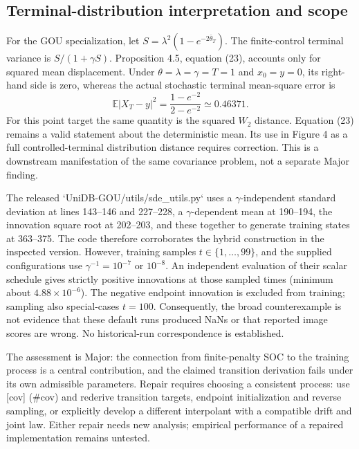 \documentclass[10pt]{article}
\begin{document}
\subsection*{Terminal-distribution interpretation and scope}
For the GOU specialization, let \(S=\lambda^2(1-e^{-2\bar\theta_T})\). The finite-control terminal variance is \(S/(1+\gamma S)\). Proposition 4.5, equation (23), accounts only for squared mean displacement. Under \(\theta=\lambda=\gamma=T=1\) and \(x_0=y=0\), its right-hand side is zero, whereas the actual stochastic terminal mean-square error is \[\mathbb E|X_T-y|^2=\frac{1-e^{-2}}{2-e^{-2}}\simeq0.46371.\] For this point target the same quantity is the squared \(W_2\) distance. Equation (23) remains a valid statement about the deterministic mean. Its use in Figure 4 as a full controlled-terminal distribution distance requires correction. This is a downstream manifestation of the same covariance problem, not a separate Major finding.\par
The released `UniDB-GOU/utils/sde\_utils.py` uses a \(\gamma\)-independent standard deviation at lines 143–146 and 227–228, a \(\gamma\)-dependent mean at 190–194, the innovation square root at 202–203, and these together to generate training states at 363–375. The code therefore corroborates the hybrid construction in the inspected version. However, training samples \(t\in\{1,\ldots,99\}\), and the supplied configurations use \(\gamma^{-1}=10^{-7}\) or \(10^{-8}\). An independent evaluation of their scalar schedule gives strictly positive innovations at those sampled times (minimum about \(4.88\times10^{-6}\)). The negative endpoint innovation is excluded from training; sampling also special-cases \(t=100\). Consequently, the broad counterexample is not evidence that these default runs produced NaNs or that reported image scores are wrong. No historical-run correspondence is established.\par
The assessment is Major: the connection from finite-penalty SOC to the training process is a central contribution, and the claimed transition derivation fails under its own admissible parameters. Repair requires choosing a consistent process: use [cov] (\#cov) and rederive transition targets, endpoint initialization and reverse sampling, or explicitly develop a different interpolant with a compatible drift and joint law. Either repair needs new analysis; empirical performance of a repaired implementation remains untested.\par
\end{document}
